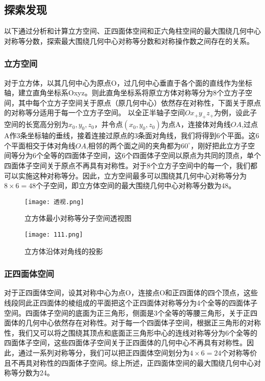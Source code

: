 \documentclass{style}
\begin{document}
\subsection{探索发现} %
\label{sub:探索发现}
以下通过分析和计算立方空间、正四面体空间和正六角柱空间的最大围绕几何中心对称等分数，探索最大围绕几何中心对称等分数和对称操作数之间存在的关系。
\subsubsection{立方空间}
\label{sub:立方空间}
对于立方体，以其几何中心为原点O，过几何中心垂直于各个面的直线作为坐标轴，建立直角坐标系Oxyz。则此直角坐标系将原立方体对称等分为8个立方子空间，其中每个立方子空间关于原点（原几何中心）依然存在对称性，下面关于原点的对称等分适用于每一个立方子空间。
以全正半轴子空间$Ox_+y_+z_+$为例，设此子空间的长宽高分别为$x_0, y_0, z_0$，并令点$(x_0, y_0, z_0)$为点A，连接体对角线$OA$,过点A作3条坐标轴的垂线，接着连接过原点的3条面对角线，我们将得到6个平面。这6个平面相交于体对角线$OA$,相邻的两个面之间的夹角都为$60^\circ$，刚好把此立方子空间等分为6个全等的四面体子空间，这6个四面体子空间以原点为共同的顶点，单个四面体子空间关于原点不再具有对称性。对于8个立方子空间中的每一个，我们都可以实施这种对称等分。因此，立方空间最多可以围绕其几何中心对称等分为$8\times6=48$个子空间，即立方体空间的最大围绕几何中心对称等分数为48。
\begin{figure}[H]
\begin{minipage}[H]{0.5\linewidth}
\centering
\texttt{[image: 透视.png]}
\caption{立方体最小对称等分子空间透视图}
\label{fig:side:a}
\end{minipage}%
\begin{minipage}[H]{0.5\linewidth}
\centering
\texttt{[image: 111.png]}
\caption{立方体沿体对角线的投影}
\label{fig:side:b}
\end{minipage}
\end{figure}

\subsubsection{正四面体空间} %
\label{sub:b_正四面体空间}
对于正四面体空间，设其对称中心为点O，连接点O和正四面体的四个顶点，这些线段同此正四面体的棱组成的平面把这个正四面体对称等分为4个全等的四面体子空间。四面体子空间的底面为正三角形，侧面是3个全等的等腰三角形，关于正四面体的几何中心依然存在对称性。对于每一个四面体子空间，根据正三角形的对称性，我们又可以将之围绕其顶点和底面正三角形中心的连线对称等分为6个全等的四面体子空间，这些四面体子空间关于正四面体的几何中心不再具有对称性。因此，通过一系列对称等分，我们可以把正四面体空间划分为$4\times6=24$个对称等价且不再具对称性的四面体子空间。综上所述，正四面体空间的最大围绕几何中心对称等分数为24。
\end{document}
